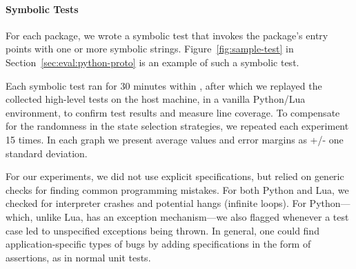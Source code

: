 \paragraph{Symbolic Tests}

For each package, we wrote a symbolic test that invokes the package's entry points with one or more symbolic strings.  
Figure~\ref{fig:sample-test} in Section~\ref{sec:eval:python-proto} is an example of such a symbolic test.

Each symbolic test ran for 30 minutes within \chef, after which we replayed the collected high-level tests on the host machine, in a vanilla Python/Lua environment, to confirm test results and measure line coverage.  To compensate for the randomness in the state selection strategies, we repeated each experiment 15 times.  In each graph we present average values and error margins as +/- one standard deviation.

For our experiments, we did not use explicit specifications, but relied on generic checks for finding common programming mistakes.  For both Python and Lua, we checked for interpreter crashes and potential hangs (infinite loops). 
For Python---which, unlike Lua, has an exception mechanism---we also flagged whenever a test case led to unspecified exceptions being thrown.
%
In general, one could find application-specific types of bugs by adding specifications in the form of assertions, as in normal unit tests.


